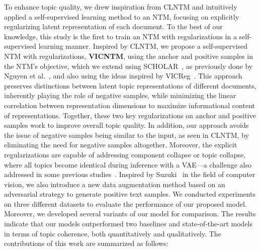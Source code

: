 \documentclass{article}
\begin{document}
To enhance topic quality, we drew inspiration from CLNTM and intuitively applied a self-supervised learning method to an NTM, focusing on explicitly regularizing latent representation of each document.
To the best of our knowledge, this study is the first to train an NTM with regularizations in a self-supervised learning manner.
Inspired by CLNTM, we propose a self-supervised NTM with regularizations, \textbf{VICNTM}, using the anchor and positive samples in the NTM's objective, which we extend using SCHOLAR~\cite{card2018neural}, as previously done by Nguyen et al.~\cite{nguyen2021contrastive}, and also using the ideas inspired by VICReg~\cite{bardes2022vicreg}.
This approach preserves distinctions between latent topic representations of different documents, inherently playing the role of negative samples, while minimizing the linear correlation between representation dimensions to maximize informational content of representations.
Together, these two key regularizations on anchor and positive samples work to improve overall topic quality. 
In addition, our approach avoids the issue of negative samples being similar to the input, as seen in CLNTM, by eliminating the need for negative samples altogether.
Moreover, the explicit regularizations are capable of addressing component collapse or topic collapse, where all topics become identical during inference with a VAE---a challenge also addressed in some previous studies~\cite{srivastava2017autoencoding,wu2023effective}.
Inspired by Suzuki~\cite{Suzuki_2022_CVPR} in the field of computer vision, we also introduce a new data augmentation method based on an adversarial strategy to generate positive text samples.
We conducted experiments on three different datasets to evaluate the performance of our proposed model.
Moreover, we developed several variants of our model for comparison. 
The results indicate that our models outperformed two baselines and state-of-the-art models in terms of topic coherence, both quantitatively and qualitatively. 
The contributions of this work are summarized as follows:
\end{document}
